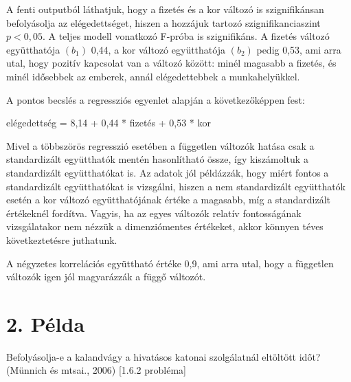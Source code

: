 \documentclass[
  letterpaper,
]{krantz}
\makeatletter
\newenvironment{Shaded}{\begin{snugshade}}{\end{snugshade}}
\newcommand{\NormalTok}[1]{\textcolor[rgb]{0.00,0.23,0.31}{#1}}
\newenvironment{kframe}{%
\medskip{}
\setlength{\fboxsep}{.8em}
 \def\at@end@of@kframe{}%
 \ifinner\ifhmode%
  \def\at@end@of@kframe{\end{minipage}}%
  \begin{minipage}{\columnwidth}%
 \fi\fi%
 \def\FrameCommand##1{\hskip\@totalleftmargin \hskip-\fboxsep
 \colorbox{shadecolor}{##1}\hskip-\fboxsep
     \hskip-\linewidth \hskip-\@totalleftmargin \hskip\columnwidth}%
 \MakeFramed {\advance\hsize-\width
   \@totalleftmargin\z@ \linewidth\hsize
   \@setminipage}}%
 {\par\unskip\endMakeFramed%
 \at@end@of@kframe}
\renewenvironment{Shaded}{\begin{kframe}}{\end{kframe}}
\makeatother
\begin{document}
A fenti outputból láthatjuk, hogy a fizetés és a kor változó is
szignifikánsan befolyásolja az elégedettséget, hiszen a hozzájuk tartozó
szignifikanciaszint \(p<0,05\). A teljes modell vonatkozó F-próba is
szignifikáns. A fizetés változó együtthatója \((b_1)\) 0,44, a kor
változó együtthatója \((b_2)\) pedig 0,53, ami arra utal, hogy pozitív
kapcsolat van a változó között: minél magasabb a fizetés, és minél
idősebbek az emberek, annál elégedettebbek a munkahelyükkel.

A pontos becslés a regressziós egyenlet alapján a következőképpen fest:

\begin{Shaded}
\begin{Highlighting}[]
\NormalTok{elégedettség = 8,14 + 0,44 * fizetés + 0,53 * kor}
\end{Highlighting}
\end{Shaded}

Mivel a többszörös regresszió esetében a független változók hatása csak
a standardizált együtthatók mentén hasonlítható össze, így kiszámoltuk a
standardizált együtthatókat is. Az adatok jól példázzák, hogy miért
fontos a standardizált együtthatókat is vizsgálni, hiszen a nem
standardizált együtthatók esetén a kor változó együtthatójának értéke a
magasabb, míg a standardizált értékeknél fordítva. Vagyis, ha az egyes
változók relatív fontosságának vizsgálatakor nem nézzük a dimenziómentes
értékeket, akkor könnyen téves következtetésre juthatunk.

A négyzetes korrelációs együttható értéke 0,9, ami arra utal, hogy a
független változók igen jól magyarázzák a függő változót.

\hypertarget{puxe9lda-1}{%
\section{2. Példa}\label{puxe9lda-1}}

Befolyásolja-e a kalandvágy a hivatásos katonai szolgálatnál eltöltött
időt? (Münnich és mtsai., 2006) {[}1.6.2 probléma{]}
\end{document}

